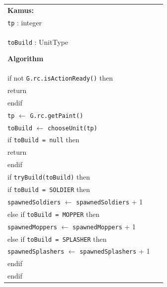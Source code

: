 \documentclass{article}
\newenvironment{pseudobox}
{
\centering
\begin{longtable}{|p{0.94\linewidth}|}
\hline
}
{
\\ \hline
\end{longtable}
\vspace{0.05cm}
}
\begin{document}
\begin{enumerate}[label=\alph*.]
\begin{enumerate}[label=\alph*.]
\begin{pseudobox}
\textbf{Kamus:} \\
\hspace*{1.5em}\texttt{tp} : integer \\
\hspace*{1.5em}\texttt{toBuild} : UnitType

\textbf{Algorithm} \\
\hspace*{1.5em}if not \texttt{G.rc.isActionReady()} then \\
\hspace*{3em}return \\
\hspace*{1.5em}endif \\

\hspace*{1.5em}\texttt{tp} $\leftarrow$ \texttt{G.rc.getPaint()} \\
\hspace*{1.5em}\texttt{toBuild} $\leftarrow$ \texttt{chooseUnit(tp)} \\

\hspace*{1.5em}if \texttt{toBuild = null} then \\
\hspace*{3em}return \\
\hspace*{1.5em}endif \\

\hspace*{1.5em}if \texttt{tryBuild(toBuild)} then \\
\hspace*{3em}if \texttt{toBuild = SOLDIER} then \\
\hspace*{4.5em}\texttt{spawnedSoldiers} $\leftarrow$ \texttt{spawnedSoldiers} + 1 \\
\hspace*{3em}else if \texttt{toBuild = MOPPER} then \\
\hspace*{4.5em}\texttt{spawnedMoppers} $\leftarrow$ \texttt{spawnedMoppers} + 1 \\
\hspace*{3em}else if \texttt{toBuild = SPLASHER} then \\
\hspace*{4.5em}\texttt{spawnedSplashers} $\leftarrow$ \texttt{spawnedSplashers} + 1 \\
\hspace*{3em}endif \\
\hspace*{1.5em}endif
\end{pseudobox}


\end{enumerate}
\end{enumerate}
\end{document}
